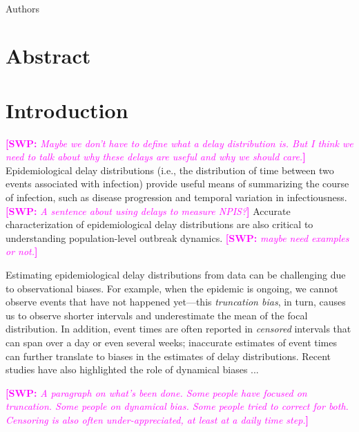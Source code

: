\documentclass[12pt]{article}
\date{\today}
\newcommand{\comment}{\showcomment}
\newcommand{\showcomment}[3]{\textcolor{#1}{\textbf{[#2: }\textsl{#3}\textbf{]}}}
\newcommand{\swp}[1]{\comment{magenta}{SWP}{#1}}
\begin{document}
\begin{flushleft}{
	\Large
	\textbf{}
}
\newline
\\
Authors
\bigskip

\bigskip

\section*{Abstract}

\end{flushleft}

\pagebreak

\section{Introduction}

\swp{Maybe we don't have to define what a delay distribution is. But I think we need to talk about why these delays are useful and why we should care.}
Epidemiological delay distributions (i.e., the distribution of time between two events associated with infection) provide useful means of summarizing the course of infection, such as disease progression \citep{lauer2020incubation,verity2020estimates} and temporal variation in infectiousness.
\swp{A sentence about using delays to measure NPIS?}
Accurate characterization of epidemiological delay distributions are also critical to understanding population-level outbreak dynamics. \swp{maybe need examples or not.}

Estimating epidemiological delay distributions from data can be challenging due to observational biases.
For example, when the epidemic is ongoing, we cannot observe events that have not happened yet---this \emph{truncation bias}, in turn, causes us to observe shorter intervals and underestimate the mean of the focal distribution.
In addition, event times are often reported in \emph{censored} intervals that can span over a day or even several weeks;
inaccurate estimates of event times can further translate to biases in the estimates of delay distributions.
Recent studies have also highlighted the role of dynamical biases ...

\swp{A paragraph on what's been done. Some people have focused on truncation. Some people on dynamical bias. Some people tried to correct for both. Censoring is also often under-appreciated, at least at a daily time step.}
\end{document}
